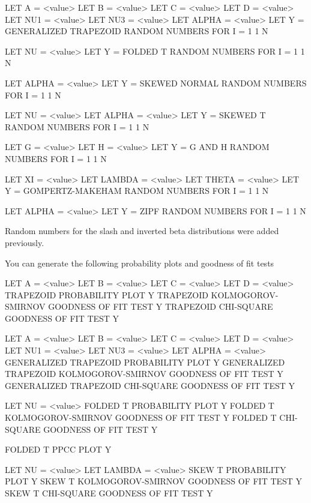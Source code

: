 {           LET A = <value>
           LET B = <value>
           LET C = <value>
           LET D = <value>
           LET NU1 = <value>
           LET NU3 = <value>
           LET ALPHA = <value>
           LET Y = GENERALIZED TRAPEZOID RANDOM NUMBERS FOR I = 1 1 N

           LET NU = <value>
           LET Y = FOLDED T RANDOM NUMBERS FOR I = 1 1 N

           LET ALPHA = <value>
           LET Y = SKEWED NORMAL RANDOM NUMBERS FOR I = 1 1 N

           LET NU = <value>
           LET ALPHA = <value>
           LET Y = SKEWED T RANDOM NUMBERS FOR I = 1 1 N

           LET G = <value>
           LET H = <value>
           LET Y = G AND H RANDOM NUMBERS FOR I = 1 1 N

           LET XI = <value>
           LET LAMBDA = <value>
           LET THETA = <value>
           LET Y = GOMPERTZ-MAKEHAM RANDOM NUMBERS FOR I = 1 1 N

           LET ALPHA = <value>
           LET Y = ZIPF RANDOM NUMBERS FOR I = 1 1 N

     Random numbers for the slash and inverted beta distributions
     were added previously.

     You can generate the following probability plots and goodness
     of fit tests

           LET A = <value>
           LET B = <value>
           LET C = <value>
           LET D = <value>
           TRAPEZOID PROBABILITY PLOT Y
           TRAPEZOID KOLMOGOROV-SMIRNOV GOODNESS OF FIT TEST Y
           TRAPEZOID CHI-SQUARE GOODNESS OF FIT TEST Y

           LET A = <value>
           LET B = <value>
           LET C = <value>
           LET D = <value>
           LET NU1 = <value>
           LET NU3 = <value>
           LET ALPHA = <value>
           GENERALIZED TRAPEZOID PROBABILITY PLOT Y
           GENERALIZED TRAPEZOID KOLMOGOROV-SMIRNOV GOODNESS OF FIT TEST Y
           GENERALIZED TRAPEZOID CHI-SQUARE GOODNESS OF FIT TEST Y

           LET NU = <value>
           FOLDED T PROBABILITY PLOT Y
           FOLDED T KOLMOGOROV-SMIRNOV GOODNESS OF FIT TEST Y
           FOLDED T CHI-SQUARE GOODNESS OF FIT TEST Y

           FOLDED T PPCC PLOT Y

           LET NU = <value>
           LET LAMBDA = <value>
           SKEW T PROBABILITY PLOT Y
           SKEW T KOLMOGOROV-SMIRNOV GOODNESS OF FIT TEST Y
           SKEW T CHI-SQUARE GOODNESS OF FIT TEST Y

}

